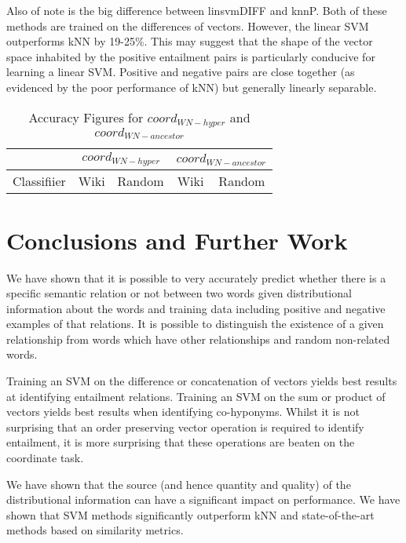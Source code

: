 \documentclass[11pt]{article}
\begin{document}
Also of note is the big difference between linsvmDIFF and knnP.  Both of these methods are trained on the differences of vectors.  However, the linear SVM outperforms kNN by 19-25\%.  This may suggest that the shape of the vector space inhabited by the positive entailment pairs is particularly conducive for learning a linear SVM.  Positive and negative pairs are close together (as evidenced by the poor performance of kNN) but generally linearly separable.

\begin{table*}[ht]
\centering
\begin{tabular}{|c|c|c|c|c|}
\hline
&\multicolumn{2}{|c|}{$coord_{WN-hyper}$}&\multicolumn{2}{|c|}{$coord_{WN-ancestor}$}\\
\hline
Classifiier&Wiki&Random&Wiki&Random\\
\hline
\hline
\end{tabular}
\caption{Accuracy Figures for $coord_{WN-hyper}$ and $coord_{WN-ancestor}$}
\label{table:results_coord_WN}
\end{table*}



\section{Conclusions and Further Work}

We have shown that it is possible to very accurately predict whether there is a specific semantic relation or not between two words given distributional information about the words and training data including positive and negative examples of that relations.  It is possible to distinguish the existence of a given relationship from words which have other relationships and random non-related words.  

Training an SVM on the difference or concatenation of vectors yields best results at identifying entailment relations.  Training an SVM on the sum or product of vectors yields best results when identifying co-hyponyms.  Whilst it is not surprising that an order preserving vector operation is required to identify entailment, it is more surprising that these operations are beaten on the coordinate task.  

We have shown that the source (and hence quantity and quality) of the distributional information can have a significant impact on performance.  We have shown that SVM methods significantly outperform kNN and state-of-the-art methods based on similarity metrics. 











\end{document}
